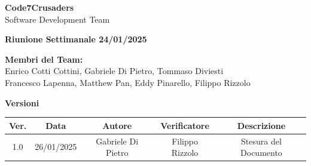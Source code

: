 \documentclass{article}
\begin{document}
\begin{titlepage}
    {\Huge \textbf{Code7Crusaders}}\\
    \vspace{0.5cm}
    {\Large Software Development Team}\\
    \vspace{2cm}
        
        {\large \textbf{Riunione Settimanale 24/01/2025}}\\
    \vspace{5cm}                           %
    
    
    \textbf{Membri del Team:}\\
    Enrico Cotti Cottini, Gabriele Di Pietro, Tommaso Diviesti \\
    Francesco Lapenna, Matthew Pan, Eddy Pinarello, Filippo Rizzolo \\
    \vspace{0.5cm}
    
    \vspace{1cm}
\end{titlepage}



\newpage
\begin{table}[h!]
\centering
\textbf{Versioni} \\ %
\vspace{2mm} %
\begin{tabular}{|c|c|c|c|c|}
    \hline
    \textbf{Ver.} & \textbf{Data} & \textbf{Autore} & \textbf{Verificatore} & \textbf{Descrizione} \\
    \hline
    1.0 & 26/01/2025 & Gabriele Di Pietro & Filippo Rizzolo & Stesura del Documento \\ 
    \hline                                  %
\end{tabular}
\end{table}

\newpage
\tableofcontents

\newpage
\end{document}
